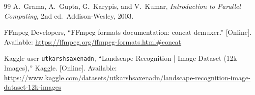 \documentclass[conference]{IEEEtran}
\begin{document}
\begin{thebibliography}{99}
A.~Grama, A.~Gupta, G.~Karypis, and V.~Kumar, \emph{Introduction to Parallel Computing}, 2nd ed.\ Addison-Wesley, 2003.

FFmpeg Developers, ``FFmpeg formats documentation: concat demuxer.'' [Online]. Available: \url{https://ffmpeg.org/ffmpeg-formats.html\#concat}

Kaggle user \texttt{utkarshsaxenadn}, ``Landscape Recognition | Image Dataset (12k Images),'' Kaggle. [Online]. Available: \url{https://www.kaggle.com/datasets/utkarshsaxenadn/landscape-recognition-image-dataset-12k-images}

\end{thebibliography}
\end{document}
